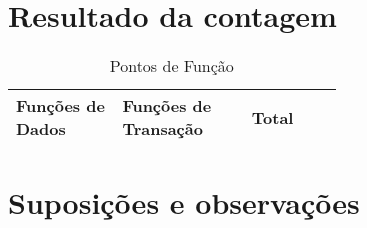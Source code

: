 \vfill
\pagebreak
\section{Resultado da contagem}

\begin{table*}[!h]
\centering
\caption{Pontos de Função}
\label{resultado_contagem}
  \begin{tabular}{|p{0.20\linewidth}|p{0.25\linewidth}|p{0.20\linewidth}|}
  \hline
  \textbf{Funções de Dados} & \textbf{Funções de Transação} & \textbf{Total} \\ 
  \hline
 
  \end{tabular}
\end{table*}

\vfill
\pagebreak
\section{Suposições e observações}

